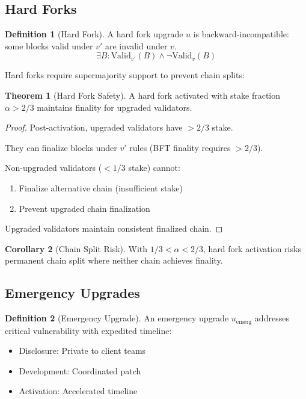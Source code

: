 \documentclass[11pt,a4paper]{article}
\theoremstyle{definition}
\newtheorem{definition}{Definition}[section]
\newtheorem{theorem}{Theorem}[section]
\newtheorem{corollary}[theorem]{Corollary}
\theoremstyle{remark}
\begin{document}
\subsection{Hard Forks}

\begin{definition}[Hard Fork]
A hard fork upgrade $u$ is backward-incompatible: some blocks valid under $v'$ are invalid under $v$.
\begin{equation}
    \exists B: \text{Valid}_{v'}(B) \land \neg \text{Valid}_v(B)
\end{equation}
\end{definition}

Hard forks require supermajority support to prevent chain splits:

\begin{theorem}[Hard Fork Safety]
A hard fork activated with stake fraction $\alpha > 2/3$ maintains finality for upgraded validators.
\end{theorem}

\begin{proof}
Post-activation, upgraded validators have $> 2/3$ stake.

They can finalize blocks under $v'$ rules (BFT finality requires $> 2/3$).

Non-upgraded validators ($< 1/3$ stake) cannot:
\begin{enumerate}
    \item Finalize alternative chain (insufficient stake)
    \item Prevent upgraded chain finalization
\end{enumerate}

Upgraded validators maintain consistent finalized chain.
\end{proof}

\begin{corollary}[Chain Split Risk]
With $1/3 < \alpha < 2/3$, hard fork activation risks permanent chain split where neither chain achieves finality.
\end{corollary}

\subsection{Emergency Upgrades}

\begin{definition}[Emergency Upgrade]
An emergency upgrade $u_{\text{emerg}}$ addresses critical vulnerability with expedited timeline:
\begin{itemize}
    \item Disclosure: Private to client teams
    \item Development: Coordinated patch
    \item Activation: Accelerated timeline
\end{itemize}
\end{definition}
\end{document}
